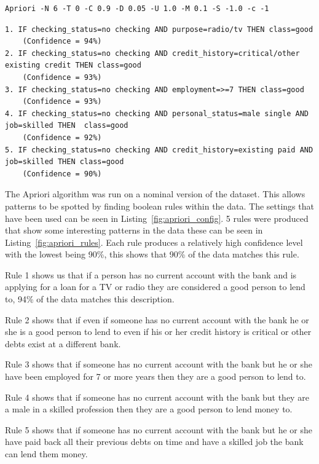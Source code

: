 \documentclass[12pt]{article}
\begin{document}
\begin{lstlisting}[caption="Apriori configuration"\label{fig:apriori_config}]
Apriori -N 6 -T 0 -C 0.9 -D 0.05 -U 1.0 -M 0.1 -S -1.0 -c -1
\end{lstlisting}
\begin{lstlisting}[caption="Apriori rules"\label{fig:apriori_rules}]
1. IF checking_status=no checking AND purpose=radio/tv THEN class=good 
    (Confidence = 94%)
2. IF checking_status=no checking AND credit_history=critical/other existing credit THEN class=good 
    (Confidence = 93%)
3. IF checking_status=no checking AND employment=>=7 THEN class=good 
    (Confidence = 93%)
4. IF checking_status=no checking AND personal_status=male single AND job=skilled THEN  class=good 
    (Confidence = 92%)
5. IF checking_status=no checking AND credit_history=existing paid AND job=skilled THEN class=good 
    (Confidence = 90%)
\end{lstlisting}

The Apriori algorithm was run on a nominal version of the dataset. This allows patterns to be spotted by finding boolean rules within the data. The settings that have been used can be seen in Listing~\ref{fig:apriori_config}. 5 rules were produced that show some interesting patterns in the data these can be seen in Listing~\ref{fig:apriori_rules}. Each rule produces a relatively high confidence level with the lowest being 90\%, this shows that 90\% of the data matches this rule. 

Rule 1 shows us that if a person has no current account with the bank and is applying for a loan for a TV or radio they are considered a good person to lend to, 94\% of the data matches this description.

Rule 2 shows that if even if someone has no current account with the bank he or she is a good person to lend to even if his or her credit history is critical or other debts exist at a different bank.

Rule 3 shows that if someone has no current account with the bank but he or she have been employed for 7 or more years then they are a good person to lend to.

Rule 4 shows that if someone has no current account with the bank but they are a male in a skilled profession then they are a good person to lend money to.

Rule 5 shows that if someone has no current account with the bank but he or she have paid back all their previous debts on time and have a skilled job the bank can lend them money.
\end{document}
